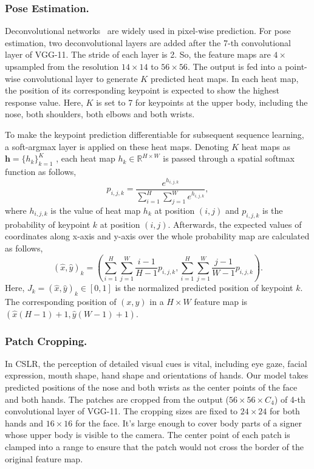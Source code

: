 \documentclass[letterpaper]{article} %
\begin{document}
\subsubsection{Pose Estimation.}
Deconvolutional networks~\cite{deconv} are widely used in pixel-wise prediction. For pose estimation, two deconvolutional layers are added after the 7-th convolutional layer of VGG-11. The stride of each layer is 2. So, the feature maps are $4\times$ upsampled from the resolution $14\times14$ to $56\times56$. The output is fed into a point-wise convolutional layer to generate $K$ predicted heat maps. In each heat map, the position of its corresponding keypoint is expected to show the highest response value. Here, $K$ is set to 7 for keypoints at the upper body, including the nose, both shoulders, both elbows and both wrists.

To make the keypoint prediction differentiable for subsequent sequence learning, a soft-argmax layer is applied on these heat maps. Denoting $K$ heat maps as $\mathbf{h}=\{h_k\}_{k=1}^K$ , each heat map $h_k\in \mathbb{R}^{H\times W}$ is passed through a spatial softmax function as follows,
\begin{equation}
    p_{i,j,k}=\frac{e^{h_{i,j,k}}}{\sum_{i=1}^{H}{\sum_{j=1}^{W}{ e^{h_{i,j,k}} }} },
\end{equation}
where $h_{i,j,k}$ is the value of heat map $h_k$ at position $(i,j)$ and $p_{i, j, k}$ is the probability of keypoint $k$ at position $(i, j)$. Afterwards, the expected values of coordinates along x-axis and y-axis over the whole probability map are calculated as follows,
\begin{equation}
    (\hat{x}, \hat{y})_k \!=\! \left(\sum_{i=1}^{H}{\sum_{j=1}^{W}{ \frac{i\!-\!1}{H\!-\!1} p_{i,j,k} }}, \sum_{i=1}^{H}{\sum_{j=1}^{W}{ \frac{j\!-\!1}{W\!-\!1} p_{i,j,k} }}\right).
\end{equation}
Here, $J_k\!=\!(\hat{x},\hat{y})_k\in[0,1]$ is the normalized predicted position of keypoint $k$. The corresponding position of $(x, y)$ in a $H\times W$ feature map is $\left(\hat{x}(H\!-\!1)+1, \hat{y}(W\!-\!1)+1 \right)$.

\subsubsection{Patch Cropping.}
In CSLR, the perception of detailed visual cues is vital, including eye gaze, facial expression, mouth shape, hand shape and orientations of hands.
Our model takes predicted positions of the nose and both wrists as the center points of the face and both hands.
The patches are cropped from the output ($56\times 56\times C_4$) of 4-th convolutional layer of VGG-11. The cropping sizes are fixed to $24\times 24$ for both hands and $16\times16$ for the face. It's large enough to cover body parts of a signer whose upper body is visible to the camera. The center point of each patch is clamped into a range to ensure that the patch would not cross the border of the original feature map.
\end{document}
